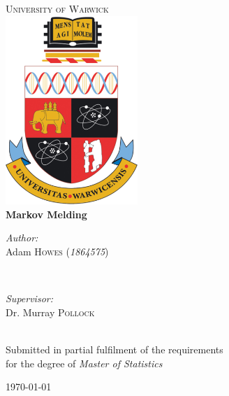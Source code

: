 \begin{titlepage}

\vspace{1cm}

\center %

\textsc{\LARGE University of Warwick}\\[1.5cm] %

\includegraphics[width = 5cm]{tex/Warwick_crest.png}\\[1.5cm] %

{\huge \bfseries Markov Melding}\\[2.5cm] %

\begin{minipage}{0.4\textwidth}
\begin{flushleft} \large
\emph{Author:}\\
Adam \textsc{Howes} (\emph{1864575}) %
\end{flushleft}
\end{minipage}
~
\begin{minipage}{0.4\textwidth}
\begin{flushright} \large
\emph{Supervisor:} \\
Dr. Murray \textsc{Pollock} %
\end{flushright}
\end{minipage}\\[2cm]

{\large Submitted in partial fulfilment of the requirements \\ for the degree of \emph{Master of Statistics}}

{\large \today}\\[2cm] %

\vfill %

\end{titlepage}
